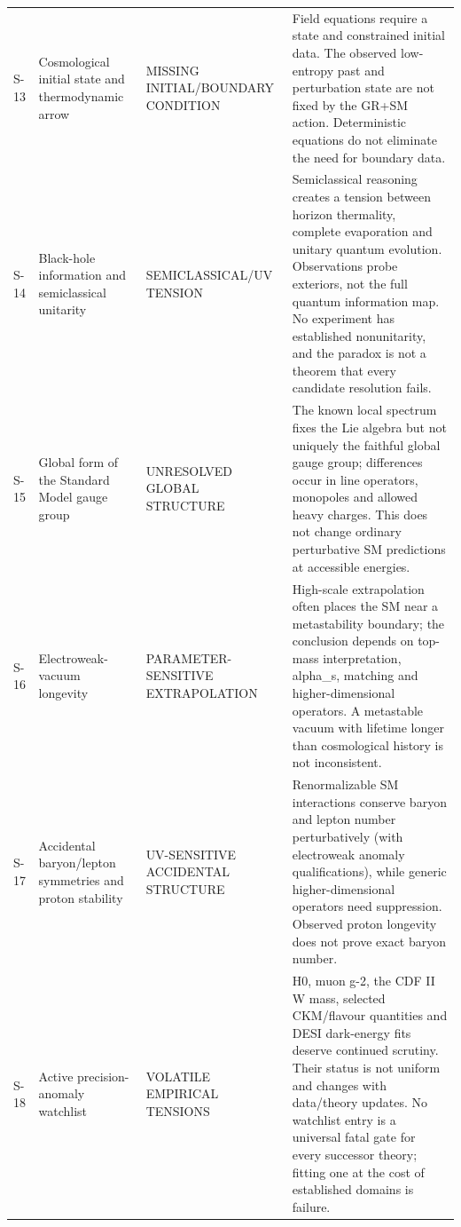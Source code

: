 \begin{longtable}{@{}p{0.7cm}p{2.35cm}p{2.55cm}p{7.4cm}@{}}
S-13 & Cosmological initial state and thermodynamic arrow & MISSING INITIAL/BOUNDARY CONDITION & Field equations require a state and constrained initial data. The observed low-entropy past and perturbation state are not fixed by the GR+SM action. Deterministic equations do not eliminate the need for boundary data. \\
S-14 & Black-hole information and semiclassical unitarity & SEMICLASSICAL/UV TENSION & Semiclassical reasoning creates a tension between horizon thermality, complete evaporation and unitary quantum evolution. Observations probe exteriors, not the full quantum information map. No experiment has established nonunitarity, and the paradox is not a theorem that every candidate resolution fails. \\
S-15 & Global form of the Standard Model gauge group & UNRESOLVED GLOBAL STRUCTURE & The known local spectrum fixes the Lie algebra but not uniquely the faithful global gauge group; differences occur in line operators, monopoles and allowed heavy charges. This does not change ordinary perturbative SM predictions at accessible energies. \\
S-16 & Electroweak-vacuum longevity & PARAMETER-SENSITIVE EXTRAPOLATION & High-scale extrapolation often places the SM near a metastability boundary; the conclusion depends on top-mass interpretation, alpha\_s, matching and higher-dimensional operators. A metastable vacuum with lifetime longer than cosmological history is not inconsistent. \\
S-17 & Accidental baryon/lepton symmetries and proton stability & UV-SENSITIVE ACCIDENTAL STRUCTURE & Renormalizable SM interactions conserve baryon and lepton number perturbatively (with electroweak anomaly qualifications), while generic higher-dimensional operators need suppression. Observed proton longevity does not prove exact baryon number. \\
S-18 & Active precision-anomaly watchlist & VOLATILE EMPIRICAL TENSIONS & H0, muon g-2, the CDF II W mass, selected CKM/flavour quantities and DESI dark-energy fits deserve continued scrutiny. Their status is not uniform and changes with data/theory updates. No watchlist entry is a universal fatal gate for every successor theory; fitting one at the cost of established domains is failure. \\
\bottomrule
\end{longtable}
\endgroup
